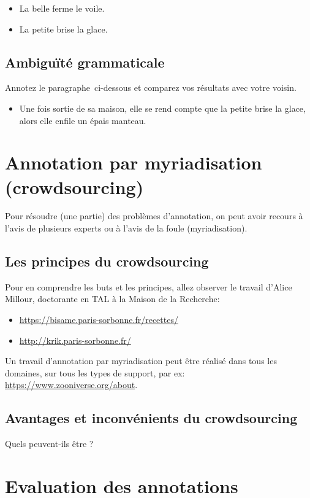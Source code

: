 \begin{itemize}
  \item La belle ferme le voile.
  \item La petite brise la glace.
\end{itemize}

\subsection{Ambiguïté grammaticale}

Annotez le paragraphe ci-dessous et comparez vos résultats avec votre voisin.
\begin{itemize}
  \item Une fois sortie de sa maison, elle se rend compte que la petite brise la glace, alors elle enfile un épais manteau.
\end{itemize}


  \section{Annotation par myriadisation (crowdsourcing)}
Pour résoudre (une partie) des problèmes d'annotation, on peut avoir recours à l'avis de plusieurs experts ou à l'avis de la foule (myriadisation).

  \subsection{Les principes du crowdsourcing}
 Pour en comprendre les buts et les principes, allez observer le travail d'Alice Millour, doctorante en TAL à la Maison de la Recherche:
\begin{itemize}
\item \url{https://bisame.paris-sorbonne.fr/recettes/} 
\item \url{http://krik.paris-sorbonne.fr/} 
\end{itemize}
 
 Un travail d'annotation par myriadisation peut être réalisé dans tous les domaines, sur tous les types de support, par ex: \url{https://www.zooniverse.org/about}.

  \subsection{ Avantages et inconvénients du crowdsourcing}

 Quels peuvent-ils être ?




  \section{Evaluation des annotations}

